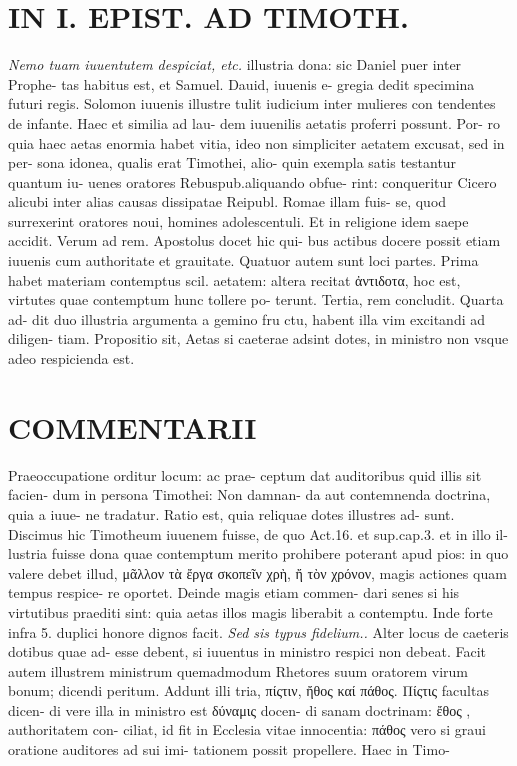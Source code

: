 \documentclass{article}
\begin{document}
\begin{pages}
\section*{IN I. EPIST. AD TIMOTH. }
\marginpar{[ p.105 ]}
\textit{Nemo tuam iuuentutem despiciat, etc. }\pstart illustria dona: sic Daniel puer inter Prophe- tas habitus est, et Samuel. Dauid, iuuenis e- gregia dedit specimina futuri regis. Solomon iuuenis illustre tulit iudicium inter mulieres con tendentes de infante. Haec et similia ad lau- dem iuuenilis aetatis proferri possunt. Por- ro quia haec aetas enormia habet vitia, ideo non simpliciter aetatem excusat, sed in per- sona idonea, qualis erat Timothei, alio- quin exempla satis testantur quantum iu- uenes oratores Rebuspub.aliquando obfue- rint: conqueritur Cicero alicubi inter alias causas dissipatae Reipubl. Romae illam fuis- se, quod surrexerint oratores noui, homines adolescentuli. Et in religione idem saepe accidit.  \pend\pstart Verum ad rem. Apostolus docet hic qui- bus actibus docere possit etiam iuuenis cum authoritate et grauitate. Quatuor autem sunt loci partes. Prima habet materiam contemptus scil. aetatem: altera recitat ἀντιδοτα, hoc est, virtutes quae contemptum hunc tollere po- terunt. Tertia, rem concludit. Quarta ad- dit duo illustria argumenta a gemino fru ctu, habent illa vim excitandi ad diligen- tiam.  \pend\pstart Propositio sit, Aetas si caeterae adsint dotes, in ministro non vsque adeo respicienda est.  \pend
\marginpar{[ p.106 ]}
\section*{COMMENTARII }\pstart Praeoccupatione orditur locum: ac prae- ceptum dat auditoribus quid illis sit facien- dum in persona Timothei: Non damnan- da aut contemnenda doctrina, quia a iuue- ne tradatur.  \pend\pstart Ratio est, quia reliquae dotes illustres ad- sunt. Discimus hic Timotheum iuuenem fuisse, de quo Act.16. et sup.cap.3. et in illo il- lustria fuisse dona quae contemptum merito prohibere poterant apud pios: in quo valere debet illud, μᾶλλον τὰ ἔργα σκοπεῖν χρὴ, ἤ τὸν χρόνον, magis actiones quam tempus respice- re oportet. Deinde magis etiam commen- dari senes si his virtutibus praediti sint: quia aetas illos magis liberabit a contemptu. Inde forte infra 5. duplici honore dignos facit.  \pend
\textit{Sed sis typus fidelium.. }\pstart Alter locus de caeteris dotibus quae ad- esse debent, si iuuentus in ministro respici non debeat. Facit autem illustrem ministrum quemadmodum Rhetores suum oratorem virum bonum; dicendi peritum. Addunt illi tria, πίςτιν, ἤθος καί πάθος. Πίςτις facultas dicen- di vere illa in ministro est δύναμις docen- di sanam doctrinam:  ἔθος , authoritatem con- ciliat, id fit in Ecclesia vitae innocentia: πάθος vero si graui oratione auditores ad sui imi- tationem possit propellere. Haec in Timo-  \pend

\end{pages}
\end{document}
